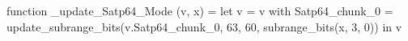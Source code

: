 function _update_Satp64_Mode (v, x) = let v = { v with Satp64_chunk_0 = update_subrange_bits(v.Satp64_chunk_0, 63, 60, subrange_bits(x, 3, 0)) } in
  v
